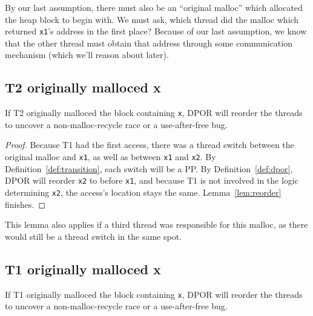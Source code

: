 By our last assumption, there must also be an ``original malloc'' which allocated the heap block to begin with.
We must ask, which thread did the malloc which returned {\tt x1}'s address in the first place?
Because of our last assumption, we know that the other thread must obtain that address through some communication mechanism (which we'll reason about later).

\subsection{T2 originally malloced x}

\begin{lemma}[Greedo]
	If T2 originally malloced the block containing {\tt x}, DPOR will reorder the threads to uncover a non-malloc-recycle race or a use-after-free bug.
	\label{lem:greedo}
\end{lemma}
\begin{proof}
Because T1 had the first access, there was a thread switch between the original malloc and {\tt x1}, as well as between {\tt x1} and {\tt x2}. By Definition~\ref{def:transition}, each switch will be a PP.
By Definition~\ref{def:dpor}, DPOR will reorder {\tt x2} to before {\tt x1},
and because T1 is not involved in the logic determining {\tt x2}, the access's location stays the same.
Lemma~\ref{lem:reorder} finishes.
\end{proof}

This lemma also applies if a third thread was responsible for this malloc, as there would still be a thread switch in the same spot.

\subsection{T1 originally malloced x}

\begin{lemma}[Han]
	If T1 originally malloced the block containing {\tt x}, DPOR will reorder the threads to uncover a non-malloc-recycle race or a use-after-free bug.
	\label{lem:han}
\end{lemma}

